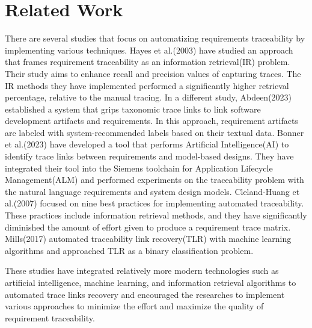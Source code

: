 \documentclass[conference]{IEEEtran}
\begin{document}
\section{Related Work}
\label{section:related_work}

There are several studies that focus on automatizing requirements traceability by implementing various techniques. Hayes et al.(2003) have studied an approach that frames requirement traceability as an information retrieval(IR) problem. Their study aims to enhance recall and precision values of capturing traces. The IR methods they have implemented performed a significantly higher retrieval percentage, relative to the manual tracing. In a different study, Abdeen(2023) established a system that grips taxonomic trace links to link software development artifacts and requirements. In this approach, requirement artifacts are labeled with system-recommended labels based on their textual data. Bonner et al.(2023) have developed a tool that performs Artificial Intelligence(AI) to identify trace links between requirements and model-based designs. They have integrated their tool into the Siemens toolchain for Application Lifecycle Management(ALM) and performed experiments on the traceability problem with the natural language requirements and system design models. Cleland-Huang et al.(2007) focused on nine best practices for implementing automated traceability. These practices include information retrieval methods, and they have significantly diminished the amount of effort given to produce a requirement trace matrix. Mills(2017) automated traceability link recovery(TLR) with machine learning algorithms and approached TLR as a binary classification problem.

These studies have integrated relatively more modern technologies such as artificial intelligence, machine learning, and information retrieval algorithms to automated trace links recovery and encouraged the researches to implement various approaches to minimize the effort and maximize the quality of requirement traceability.

\end{document}
